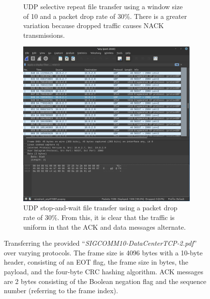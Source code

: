 \documentclass[runningheads]{llncs}
\begin{document}
\begin{figure}[htp]
\begin{subfigure}{0.32\linewidth}
  \caption{UDP selective repeat file transfer using a window size of 10 and a packet drop rate of 30\%. There is a greater variation because dropped traffic causes NACK transmissions.}
  \label{fig:udp2}
\end{subfigure}
\begin{subfigure}{0.32\linewidth}
  \centering
  \includegraphics[width=1\linewidth]{Figures/UDP1_packet_capture.png}
  \caption{UDP stop-and-wait file transfer using a packet drop rate of 30\%. From this, it is clear that the traffic is uniform in that the ACK and data messages alternate.\vspace{10pt}}
  \label{fig:udp1}
\end{subfigure}
\caption{Transferring the provided ``\emph{SIGCOMM10-DataCenterTCP-2.pdf}'' over varying protocols. The frame size is 4096 bytes with a 10-byte header, consisting of an EOT flag, the frame size in bytes, the payload, and the four-byte CRC hashing algorithm. ACK messages are 2 bytes consisting of the Boolean negation flag and the sequence number (referring to the frame index).\label{fig:pcaps}}
\end{figure}
\end{document}

